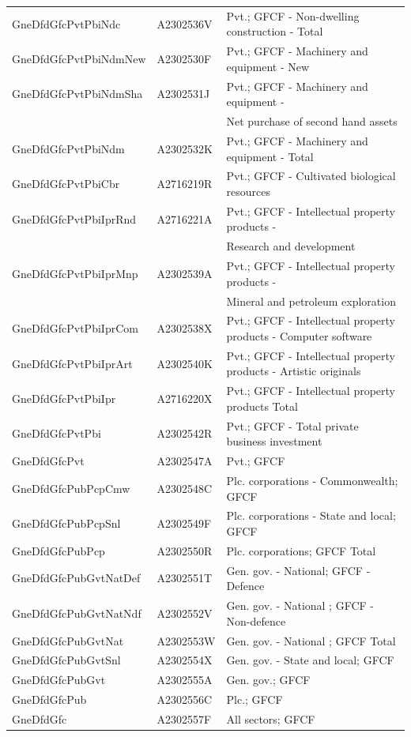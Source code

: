 \documentclass[graybox]{svmult}
\begin{document}
\begin{table}[t]
\begin{tabular*}{\columnwidth}[width = \textwidth]{lll}
			\addlinespace
			GneDfdGfcPvtPbiNdc & A2302536V & Pvt.; GFCF - Non-dwelling construction - Total\\
			GneDfdGfcPvtPbiNdmNew & A2302530F & Pvt.; GFCF - Machinery and equipment - New\\
			GneDfdGfcPvtPbiNdmSha & A2302531J & Pvt.; GFCF - Machinery and equipment -\\
			&  & Net purchase of second hand assets\\
			GneDfdGfcPvtPbiNdm & A2302532K & Pvt.; GFCF - Machinery and equipment - Total\\
			\addlinespace
			GneDfdGfcPvtPbiCbr & A2716219R & Pvt.; GFCF - Cultivated biological resources\\
			GneDfdGfcPvtPbiIprRnd & A2716221A & Pvt.; GFCF - Intellectual property products -\\
			&  & Research and development\\
			GneDfdGfcPvtPbiIprMnp & A2302539A & Pvt.; GFCF - Intellectual property products -\\
			&  & Mineral and petroleum exploration\\
			\addlinespace
			GneDfdGfcPvtPbiIprCom & A2302538X & Pvt.; GFCF - Intellectual property products - Computer software\\
			GneDfdGfcPvtPbiIprArt & A2302540K & Pvt.; GFCF - Intellectual property products - Artistic originals\\
			GneDfdGfcPvtPbiIpr & A2716220X & Pvt.; GFCF - Intellectual property products Total\\
			GneDfdGfcPvtPbi & A2302542R & Pvt.;  GFCF - Total private business investment\\
			GneDfdGfcPvt & A2302547A & Pvt.; GFCF\\
			\addlinespace
			GneDfdGfcPubPcpCmw & A2302548C & Plc. corporations - Commonwealth; GFCF\\
			GneDfdGfcPubPcpSnl & A2302549F & Plc. corporations - State and local; GFCF\\
			GneDfdGfcPubPcp & A2302550R & Plc. corporations; GFCF Total\\
			GneDfdGfcPubGvtNatDef & A2302551T & Gen. gov. - National; GFCF - Defence\\
			GneDfdGfcPubGvtNatNdf & A2302552V & Gen. gov. - National ; GFCF - Non-defence\\
			\addlinespace
			GneDfdGfcPubGvtNat & A2302553W & Gen. gov. - National ; GFCF Total\\
			GneDfdGfcPubGvtSnl & A2302554X & Gen. gov. - State and local; GFCF\\
			GneDfdGfcPubGvt & A2302555A & Gen. gov.; GFCF\\
			GneDfdGfcPub & A2302556C & Plc.; GFCF\\
			GneDfdGfc & A2302557F & All sectors; GFCF\\
			\bottomrule
		\end{tabular*}
		
		\label{Tab:Expenditure-hierarchy-1}
	
\end{table}
\end{document}
